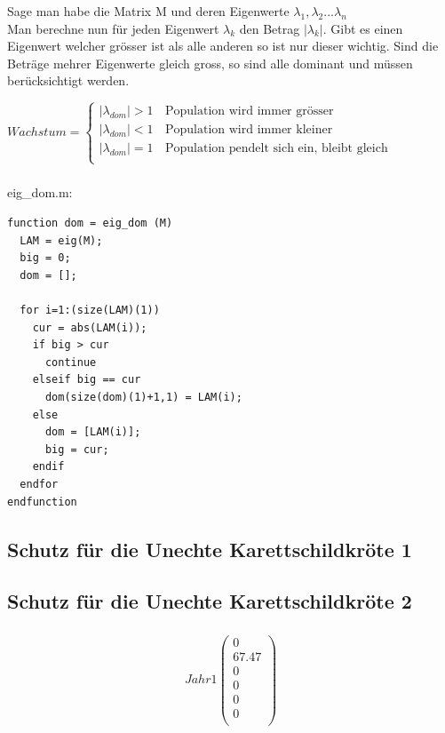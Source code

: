 \documentclass{article}
\begin{document}
\subsubsection{}
Sage man habe die Matrix M und deren Eigenwerte $\lambda_1, \lambda_2 ... \lambda_n$ \\
Man berechne nun für jeden Eigenwert $\lambda_k$ den Betrag $|\lambda_k|$. Gibt es einen Eigenwert welcher grösser ist als alle anderen so ist nur dieser wichtig. Sind die Beträge mehrer Eigenwerte gleich gross, so sind alle dominant und müssen berücksichtigt werden.

\vspace{5mm}

$Wachstum = \left\{
\begin{array}{ll}
|\lambda_{dom}| > 1 & \, \textrm{Population wird immer grösser} \\
|\lambda_{dom}| < 1 & \, \textrm{Population wird immer kleiner} \\
|\lambda_{dom}| = 1 & \, \textrm{Population pendelt sich ein, bleibt gleich} \\
\end{array}
\right. $

\subsubsection{}

eig\_dom.m:
\begin{lstlisting}
function dom = eig_dom (M)
  LAM = eig(M);
  big = 0;
  dom = [];
  
  for i=1:(size(LAM)(1))
    cur = abs(LAM(i));
    if big > cur
      continue
    elseif big == cur
      dom(size(dom)(1)+1,1) = LAM(i);
    else
      dom = [LAM(i)];
      big = cur;
    endif
  endfor
endfunction
\end{lstlisting}

\subsection{Schutz für die Unechte Karettschildkröte 1}

\subsection{Schutz für die Unechte Karettschildkröte 2}

\subsubsection{}
\[
Jahr 1
  \begin{pmatrix}
    0 \\
    67.47 \\
    0 \\
    0 \\
    0 \\
    0 \\
  \end{pmatrix}
\]
\end{document}
